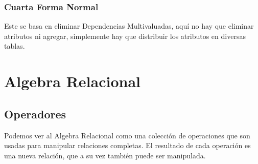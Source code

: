 \documentclass[12pt, fleqn]{report}                             %
\theoremstyle{break}                                            %
\begin{document}
            


            \clearpage
            \subsection{Cuarta Forma Normal}

                Este se basa en eliminar Dependencias Multivaluadas, aquí no hay que
                eliminar atributos ni agregar, simplemente hay que distribuir los atributos
                en diversas tablas.




    \chapter{Algebra Relacional}


        \clearpage
        \section{Operadores}

            Podemos ver al Algebra Relacional como una colección de operaciones que
            son usadas para manipular relaciones completas. El resultado de cada
            operación es una nueva relación, que a su vez también puede ser manipulada.

















\end{document}

